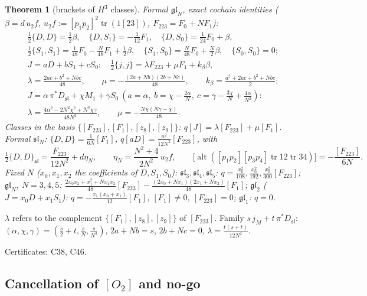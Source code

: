 \documentclass[10pt,a4paper]{article}
\numberwithin{equation}{section}
\newtheorem{theorem}{Theorem}[section]
\theoremstyle{definition}
\theoremstyle{remark}
\newcommand{\tr}{\operatorname{tr}}
\newcommand{\alt}{\operatorname{alt}}
\newcommand{\fsl}{\mathfrak{sl}}
\newcommand{\fgl}{\mathfrak{gl}}
\newcommand{\cert}[1]{\par\noindent\textup{Certificates: #1.}\par}
\newcommand{\uf}{u_2f}
\begin{document}
\begin{theorem}[brackets of $H^3$ classes]\label{thm-quad}
Formal $\fgl_N$, exact cochain identities ($\beta=d\,\uf$, $\uf:=[p_1p_2]^2\tr(1[23])$, $F_{223}=F_0+NF_1$):
\begin{gather}
\tfrac12\{D,D\}=\tfrac12\beta,\quad\{D,S_1\}=-\tfrac1{12}F_1,\quad\{D,S_0\}=\tfrac1{24}F_0+\beta,\\
\tfrac12\{S_1,S_1\}=\tfrac1{48}F_0-\tfrac N{48}F_1+\tfrac12\beta,\quad\{S_1,S_0\}=\tfrac N{48}F_0+\tfrac N2\beta,\quad\{S_0,S_0\}=0;\\
J=aD+bS_1+cS_0:\quad \tfrac12\{j,j\}=\lambda F_{223}+\mu F_1+k_\beta\beta,\\
\lambda=\frac{2ac+b^2+Nbc}{48},\qquad \mu=-\frac{(2a+Nb)(2b+Nc)}{48},\qquad k_\beta=\frac{a^2+2ac+b^2+Nbc}2;\\
J=\alpha\,\pi^*D_{\fsl}+\chi M_1+\gamma S_0\ (a=\alpha,\ b=\chi-\tfrac{2\alpha}N,\ c=\gamma-\tfrac{3\chi}N+\tfrac{4\alpha}{N^2}):\\ \lambda=\frac{4\alpha^2-2N^2\chi^2+N^3\chi\gamma}{48N^2},\qquad \mu=-\frac{N\chi(N\gamma-\chi)}{48}.
\end{gather}
Classes in the basis $\{[F_{223}],[F_1],[z_8],[z_9]\}$: $q[J]=\lambda[F_{223}]+\mu[F_1]$. Formal $\fsl_N$: $\{D,D\}=\frac1{6N}[F_1]$, $q[aD]=\frac{a^2}{12N^2}[F_{223}]$, with
\begin{equation}
\tfrac12\{D,D\}_{\fsl}=\frac{F_{223}}{12N^2}+d\eta_N,\qquad \eta_N=\frac{N^2+4}{2N^2}\,\uf,\qquad \big[\alt([p_1p_2][p_3p_4]\tr12\tr34)\big]=-\frac{[F_{223}]}{6N}.
\end{equation}
Fixed $N$ ($x_0,x_1,x_2$ the coefficients of $D,S_1,S_0$): $\fsl_3,\fsl_4,\fsl_5$: $q=\frac{x_0^2}{108},\frac{x_0^2}{192},\frac{x_0^2}{300}[F_{223}]$; $\fgl_N$, $N=3,4,5$: $\frac{2x_0x_2+x_1^2+Nx_1x_2}{48}[F_{223}]-\frac{(2x_0+Nx_1)(2x_1+Nx_2)}{48}[F_1]$; $\fgl_2$ ($J=x_0D+x_1S_1$): $q=-\frac{x_1(x_0+x_1)}{12}[F_1]$, $[F_1]\ne0$, $[F_{223}]=0$; $\fgl_1$: $q=0$.
\end{theorem}
$\lambda$ refers to the complement $\{[F_1],[z_8],[z_9]\}$ of $[F_{223}]$. Family $s\,j_M+t\,\pi^*D_{\fsl}$: $(\alpha,\chi,\gamma)=(\frac s2+t,\frac sN,\frac s{N^2})$, $2a+Nb=s$, $2b+Nc=0$, $\lambda=\frac{t(s+t)}{12N^2}$.
\cert{C38, C46}

\subsection{\texorpdfstring{Cancellation of $[O_2]$ and no-go}{Cancellation of [O2] and no-go}}
\end{document}
